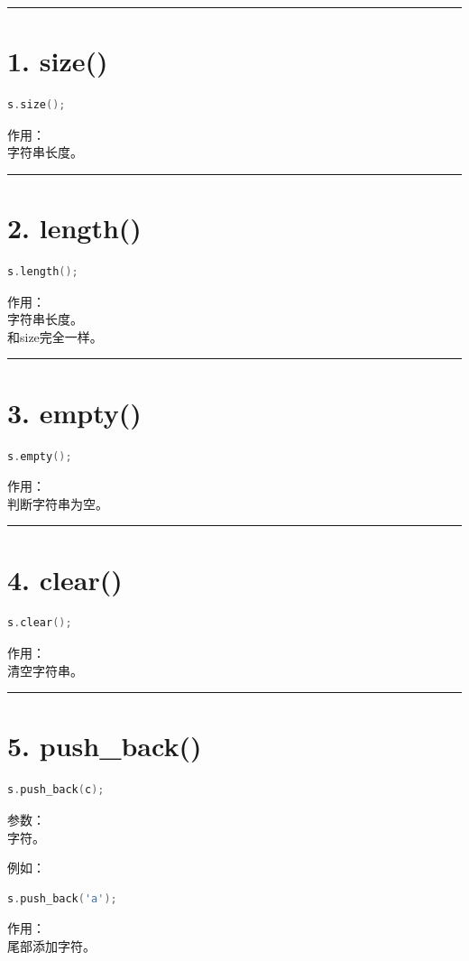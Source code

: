 \documentclass[9pt,twocolumn]{extarticle}
\begin{document}
\noindent\rule{\linewidth}{0.4pt}

\section{1. size()}
\begin{lstlisting}[language=C++]
s.size();
\end{lstlisting}
作用：\\
字符串长度。

\noindent\rule{\linewidth}{0.4pt}

\section{2. length()}
\begin{lstlisting}[language=C++]
s.length();
\end{lstlisting}
作用：\\
字符串长度。\\
和size完全一样。

\noindent\rule{\linewidth}{0.4pt}

\section{3. empty()}
\begin{lstlisting}[language=C++]
s.empty();
\end{lstlisting}
作用：\\
判断字符串为空。

\noindent\rule{\linewidth}{0.4pt}

\section{4. clear()}
\begin{lstlisting}[language=C++]
s.clear();
\end{lstlisting}
作用：\\
清空字符串。

\noindent\rule{\linewidth}{0.4pt}

\section{5. push\_back()}
\begin{lstlisting}[language=C++]
s.push_back(c);
\end{lstlisting}
参数：\\
字符。

例如：
\begin{lstlisting}[language=C++]
s.push_back('a');
\end{lstlisting}
作用：\\
尾部添加字符。
\end{document}
